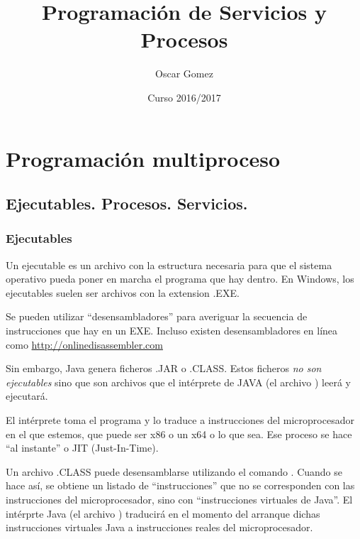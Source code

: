 \documentclass[a4paper,12pt,spanish]{sphinxmanual}
\title{Programación de Servicios y Procesos}
\date{Curso 2016/2017}
\author{Oscar Gomez}
\begin{document}
\maketitle
\tableofcontents
{}\label{index::doc}



\chapter{{}Programación multiproceso}
\label{textos/tema1:programacion-multiproceso}\label{textos/tema1::doc}\label{textos/tema1:programacion-de-servicios-y-procesos}

\section{Ejecutables. Procesos. Servicios.}
\label{textos/tema1:ejecutables-procesos-servicios}

\subsection{Ejecutables}
\label{textos/tema1:ejecutables}
Un ejecutable es un archivo con la estructura necesaria para que el sistema operativo pueda poner en marcha el programa que hay dentro. En Windows, los ejecutables suelen ser archivos con la extension .EXE.

Se pueden utilizar ``desensambladores'' para averiguar la secuencia de instrucciones que hay en un EXE. Incluso existen desensambladores en línea como \url{http://onlinedisassembler.com}

Sin embargo, Java genera ficheros .JAR o .CLASS. Estos ficheros \emph{no son ejecutables} sino que son archivos que el intérprete de JAVA (el archivo ) leerá y ejecutará.

El intérprete toma el programa y lo traduce a instrucciones del microprocesador en el que estemos, que puede ser x86 o un x64 o lo que sea. Ese proceso se hace ``al instante'' o JIT (Just-In-Time).

Un archivo .CLASS puede desensamblarse utilizando el comando  . Cuando se hace así, se obtiene un listado de ``instrucciones'' que no se corresponden con las instrucciones del microprocesador, sino con ``instrucciones virtuales de Java''. El intérprte Java (el archivo ) traducirá en el momento del arranque dichas instrucciones virtuales Java a instrucciones reales del microprocesador.
\end{document}
